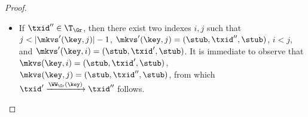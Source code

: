 \begin{proof}
\begin{enumerate}
\begin{itemize}
\begin{itemize}
\item If $\txid'' \in \T_{\Gr}$, then there exist two indexes $i,j$ such that 
$j < \lvert \mkvs'(\key, j) \rvert - 1$, $\mkvs'(\key, j) = (\stub, \txid'', \stub)$, 
$i < j$, and $\mkvs'(\key, i) = (\stub, \txid', \stub)$. It is immediate to observe 
that $\mkvs(\key, i) = (\stub, \txid', \stub)$, $\mkvs(\key, j) = (\stub, \txid'', \stub)$, 
from which $\txid' \xrightarrow{\WW_{\Gr}(\key)} \txid''$ follows. 
\end{itemize}
\end{itemize}

\end{enumerate}
\end{proof}
